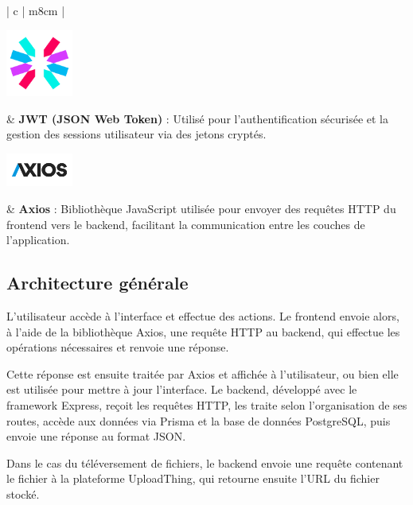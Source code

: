 \begin{table}[H]
\begin{tabular}{| c | m{8cm} |}
    \begin{minipage}{.4\linewidth}
        \centering
        \includegraphics[width=2.2cm]{images/logos/JWT.png}
    \end{minipage} 
    & \textbf{JWT (JSON Web Token)} : Utilisé pour l’authentification sécurisée et la gestion des sessions utilisateur via des jetons cryptés. \\
    \hline

    \begin{minipage}{.4\linewidth}
        \centering
        \includegraphics[width=2.2cm]{images/logos/axios.png}
    \end{minipage} 
    & \textbf{Axios} : Bibliothèque JavaScript utilisée pour envoyer des requêtes HTTP du frontend vers le backend, facilitant la communication entre les couches de l’application. \\
    \hline
  \end{tabular}
  \caption{Outils logiciels utilisés dans le développement de la plateforme IReSCoMath}
  \label{tab:outils_irescomath}
\end{table}

\subsection{Architecture générale}
L'utilisateur accède à l'interface et effectue des actions. Le frontend envoie alors, à l’aide de la bibliothèque Axios, une requête HTTP au backend, qui effectue les opérations nécessaires et renvoie une réponse.

Cette réponse est ensuite traitée par Axios et affichée à l’utilisateur, ou bien elle est utilisée pour mettre à jour l’interface. Le backend, développé avec le framework Express, reçoit les requêtes HTTP, les traite selon l'organisation de ses routes, accède aux données via Prisma et la base de données PostgreSQL, puis envoie une réponse au format JSON.

Dans le cas du téléversement de fichiers, le backend envoie une requête contenant le fichier à la plateforme UploadThing, qui retourne ensuite l’URL du fichier stocké.

